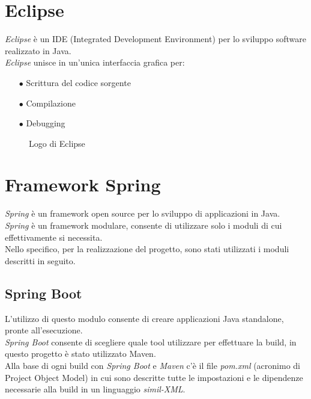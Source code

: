 \section{Eclipse}
\emph{Eclipse} è un IDE (Integrated Development Environment) per lo sviluppo software realizzato in Java.\\
\emph{Eclipse} unisce in un’unica interfaccia grafica per:
\begin{itemize}
	\item[$\bullet$]Scrittura del codice sorgente
	\item[$\bullet$]Compilazione
	\item[$\bullet$]Debugging
\end{itemize}
\begin{figure}[ht]
	\centering
	\caption{Logo di Eclipse}
	\label{fig:one}
\end{figure}

\section{Framework Spring}
\emph{Spring} è un framework open source per lo sviluppo di applicazioni in Java.\\
\emph{Spring} è un framework modulare, consente di utilizzare solo i moduli di cui effettivamente si necessita.\\
Nello specifico, per la realizzazione del progetto, sono stati utilizzati i moduli descritti in seguito.
\subsection{Spring Boot}
L’utilizzo di questo modulo consente di creare applicazioni Java standalone, pronte all’esecuzione.\\
\emph{Spring Boot} consente di scegliere quale tool utilizzare per effettuare la build, in questo progetto è stato utilizzato Maven.\\
Alla base di ogni build con \emph{Spring Boot} e \emph{Maven} c’è il file \emph{pom.xml} (acronimo di Project Object Model) in cui sono descritte tutte le impostazioni e le dipendenze necessarie alla build in un linguaggio \emph{simil-XML}.
